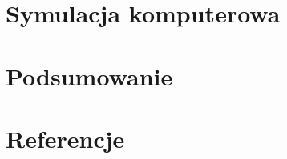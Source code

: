 \documentclass[12pt, a4paper]{report}
\begin{document}
\clearpage 

\tableofcontents

\setlength{\baselineskip}{18pt}
\clearpage 

\clearpage 

\clearpage 

\chapter{Symulacja komputerowa}

\chapter{Podsumowanie}

\chapter{Referencje}
\end{document}
